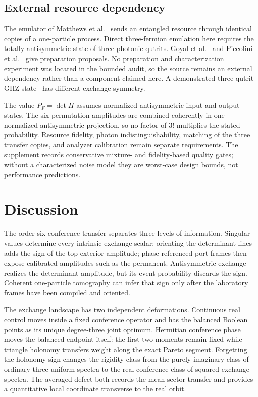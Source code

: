 \documentclass[11pt]{article}
\theoremstyle{remark}
\begin{document}
\subsection*{External resource dependency}

The emulator of Matthews et al.~\cite{Matthews} sends an entangled resource
through identical copies of a one-particle process.  Direct three-fermion
emulation here requires the totally antisymmetric state of three photonic
qutrits.  Goyal et al.~\cite{Goyal} and Piccolini et
al.~\cite{PiccoliniSinglet} give preparation proposals.  No preparation and
characterization experiment was located in the bounded audit, so the source
remains an external dependency rather than a component claimed here.  A
demonstrated three-qutrit GHZ state~\cite{Hu} has different exchange symmetry.

The value \(P_F=\det H\) assumes normalized antisymmetric input and output
states.  The six permutation amplitudes are combined coherently in one
normalized antisymmetric projection, so no factor of \(3!\) multiplies the
stated probability.  Resource fidelity, photon indistinguishability, matching
of the three transfer copies, and analyzer calibration remain separate
requirements.  The supplement records conservative mixture- and
fidelity-based quality gates; without a characterized noise model they are
worst-case design bounds, not performance predictions.

\section{Discussion}

The order-six conference transfer separates three levels of information.  Singular values
determine every intrinsic exchange scalar; orienting the determinant lines
adds the sign of the top exterior amplitude; phase-referenced port frames then
expose calibrated amplitudes such as the permanent.  Antisymmetric exchange
realizes the determinant amplitude, but its event probability discards the
sign.  Coherent one-particle tomography can infer that sign only after the
laboratory frames have been compiled and oriented.

The exchange landscape has two independent deformations.  Continuous real
control moves inside a fixed conference operator and has the balanced Boolean
points as its unique degree-three joint optimum.  Hermitian conference phase
moves the balanced endpoint itself: the first two moments remain fixed while
triangle holonomy transfers weight along the exact Pareto segment.  Forgetting
the holonomy sign changes the rigidity class from the purely imaginary class
of ordinary three-uniform spectra to the real conference class of squared
exchange spectra.  The averaged defect both records the mean sector transfer
and provides a quantitative local coordinate transverse to the real orbit.
\end{document}
